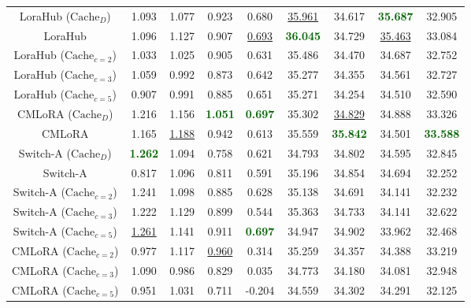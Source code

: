 \begin{table}[H]
\begin{center}
\begin{tabular}{c|cccc|cccc}
LoraHub ($\text{Cache}_{D}$) & 1.093 & 1.077 & 0.923 & 0.680 & \underline{35.961} & 34.617 & \textcolor{darkgreen}{\textbf{35.687}} & 32.905 \\
LoraHub & 1.096 & 1.127 & 0.907 & \underline{0.693} & \textcolor{darkgreen}{\textbf{36.045}} & 34.729 & \underline{35.463} & 33.084 \\
LoraHub ($\text{Cache}_{c=2}$) & 1.033 & 1.025 & 0.905 & 0.631 & 35.486 & 34.470 & 34.687 & 32.752 \\
LoraHub ($\text{Cache}_{c=3}$) & 1.059 & 0.992 & 0.873 & 0.642 & 35.277 & 34.355 & 34.561 & 32.727 \\
LoraHub ($\text{Cache}_{c=5}$) & 0.907 & 0.991 & 0.885 & 0.651 & 35.271 & 34.254 & 34.510 & 32.590 \\
\midrule
CMLoRA ($\text{Cache}_{D}$) & 1.216 & 1.156 & \textcolor{darkgreen}{\textbf{1.051}} & \textcolor{darkgreen}{\textbf{0.697}} & 35.302 & \underline{34.829} & 34.888 & 33.326 \\
CMLoRA & 1.165 & \underline{1.188} & 0.942 & 0.613 & 35.559 & \textcolor{darkgreen}{\textbf{35.842}} & 34.501 & \textcolor{darkgreen}{\textbf{33.588}} \\
Switch-A ($\text{Cache}_{D}$) & \textcolor{darkgreen}{\textbf{1.262}} & 1.094  & 0.758 & 0.621 & 34.793 & 34.802 & 34.595 & 32.845 \\
Switch-A & 0.817 & 1.096 & 0.811 & 0.591 & 35.196 & 34.854 & 34.694 & 32.252 \\
Switch-A ($\text{Cache}_{c=2}$) & 1.241  & 1.098 & 0.885 & 0.628 & 35.138 & 34.691 & 34.141 & 32.232 \\
Switch-A ($\text{Cache}_{c=3}$) & 1.222  & 1.129 & 0.899 & 0.544 & 35.363 & 34.733 & 34.141 & 32.622 \\
Switch-A ($\text{Cache}_{c=5}$) & \underline{1.261}  & 1.141 & 0.911 & \textcolor{darkgreen}{\textbf{0.697}} & 34.947 & 34.902 & 33.962 & 32.468 \\
CMLoRA ($\text{Cache}_{c=2}$) & 0.977 & 1.117 & 
\underline{0.960} & 0.314 & 35.259 & 34.357 & 34.388 & 33.219 \\
CMLoRA ($\text{Cache}_{c=3}$) & 1.090 & 0.986 & 0.829 & 0.035 & 34.773 & 34.180 & 34.081 & 32.948 \\
CMLoRA ($\text{Cache}_{c=5}$) & 0.951 & 1.031 & 0.711 & -0.204 & 34.559 & 34.302 & 34.291 & 32.125 \\
\bottomrule
\end{tabular}
\end{center}
\end{table}

